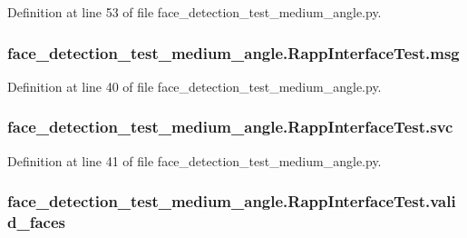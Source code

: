 Definition at line 53 of file face\-\_\-detection\-\_\-test\-\_\-medium\-\_\-angle.\-py.

\hypertarget{classface__detection__test__medium__angle_1_1RappInterfaceTest_a0f43a9b88bcebcc38d56305a724bda28}{
\subsubsection[{msg}]{\setlength{\rightskip}{0pt plus 5cm}face\-\_\-detection\-\_\-test\-\_\-medium\-\_\-angle.\-Rapp\-Interface\-Test.\-msg}}\label{classface__detection__test__medium__angle_1_1RappInterfaceTest_a0f43a9b88bcebcc38d56305a724bda28}


Definition at line 40 of file face\-\_\-detection\-\_\-test\-\_\-medium\-\_\-angle.\-py.

\hypertarget{classface__detection__test__medium__angle_1_1RappInterfaceTest_af5a73ec70ac5c263a874897eeab2e719}{
\subsubsection[{svc}]{\setlength{\rightskip}{0pt plus 5cm}face\-\_\-detection\-\_\-test\-\_\-medium\-\_\-angle.\-Rapp\-Interface\-Test.\-svc}}\label{classface__detection__test__medium__angle_1_1RappInterfaceTest_af5a73ec70ac5c263a874897eeab2e719}


Definition at line 41 of file face\-\_\-detection\-\_\-test\-\_\-medium\-\_\-angle.\-py.

\hypertarget{classface__detection__test__medium__angle_1_1RappInterfaceTest_ad9f0e0c514ef73ca565f1d261bf37384}{
\subsubsection[{valid\-\_\-faces}]{\setlength{\rightskip}{0pt plus 5cm}face\-\_\-detection\-\_\-test\-\_\-medium\-\_\-angle.\-Rapp\-Interface\-Test.\-valid\-\_\-faces}}\label{classface__detection__test__medium__angle_1_1RappInterfaceTest_ad9f0e0c514ef73ca565f1d261bf37384}


